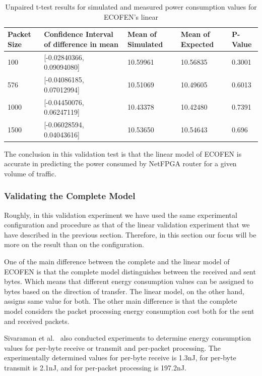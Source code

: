 \begin{table}
	\begin{tabular}{|p{1.3cm}|p{4.6cm}|p{2.1cm}|p{2.1cm}|p{1.3cm}|} 
	    \hline 
		\textbf{Packet Size} & \textbf{Confidence Interval of difference in mean} & \textbf{Mean of Simulated} & \textbf{Mean of Expected}& \textbf{P-Value}\\ 
		\hline 
		 100 &	[-0.02840366, 0.09094080]&	10.59961&	10.56835&	0.3001\\
		\hline
		 576 &	[-0.04086185, 0.07012994]&	10.51069&	10.49605&	0.6013\\ 
		\hline
		 1000&	[-0.04450076, 0.06247119]&	10.43378&	10.42480&	0.7391\\ 
	    \hline	 
	     1500&	[-0.06028594, 0.04043616]&	10.53650&	10.54643&	0.696\\ 
	    \hline
	\end{tabular} 
	\caption{Unpaired t-test results for simulated and measured power consumption values for ECOFEN's linear}
	\label{table:linearttest}
\end{table}

The conclusion in this validation test is that the linear model of ECOFEN is accurate in predicting the power consumed by NetFPGA router for a given volume of traffic. 


\subsubsection{Validating the Complete Model}
Roughly, in this validation experiment we have used the same experimental configuration and procedure as that of the linear validation experiment that we have described in the previous section. Therefore, in this section our focus will be more on the result than on the configuration.

One of the main difference between the complete and the linear model of ECOFEN is that the complete model distinguishes between the received and sent bytes. Which means that different energy consumption values can be assigned to bytes based on the direction of transfer. The linear model, on the other hand, assigns same value for both. The other main difference is that the complete model considers the packet processing energy consumption cost both for the sent and received packets. 

Sivaraman et al.{\ }\cite{Sivaraman} also conducted experiments to determine energy consumption values for per-byte receive or transmit and per-packet processing. The experimentally determined values for per-byte receive is 1.3nJ, for per-byte transmit is 2.1nJ, and for per-packet processing is 197.2nJ. 

